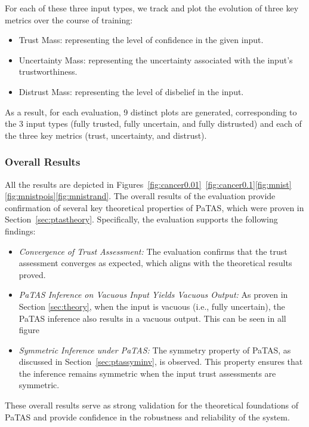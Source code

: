 For each of these three input types, we track and plot the evolution of three key metrics over the course of training:

\begin{itemize}
    \item Trust Mass: representing the level of confidence in the given input.
    \item Uncertainty Mass: representing the uncertainty associated with the input's trustworthiness.
    \item Distrust Mass: representing the level of disbelief in the input.
\end{itemize}

As a result, for each evaluation, 9 distinct plots are generated, corresponding to the 3 input types (fully trusted, fully uncertain, and fully distrusted) and each of the three key metrics (trust, uncertainty, and distrust).


\subsubsection{Overall Results}
All the results are depicted in Figures~\ref{fig:cancer0.01}~\ref{fig:cancer0.1}\ref{fig:mnist}\ref{fig:mnistpois}\ref{fig:mnistrand}. The overall results of the evaluation provide confirmation of several key theoretical properties of PaTAS, which were proven in Section~\ref{sec:ptastheory}. Specifically, the evaluation supports the following findings:

\begin{itemize}
    \item \textit{Convergence of Trust Assessment:} The evaluation confirms that the trust assessment converges as expected, which aligns with the theoretical results proved.
    \item \textit{PaTAS Inference on Vacuous Input Yields Vacuous Output:} As proven in Section \ref{sec:theory}, when the input is vacuous (i.e., fully uncertain), the PaTAS inference also results in a vacuous output. This can be seen in all figure 
    \item \textit{Symmetric Inference under PaTAS:} The symmetry property of PaTAS, as discussed in Section~\ref{sec:ptassyminv}, is observed. This property ensures that the inference remains symmetric when the input trust assessments are symmetric.
\end{itemize}

These overall results serve as strong validation for the theoretical foundations of PaTAS and provide confidence in the robustness and reliability of the system.

